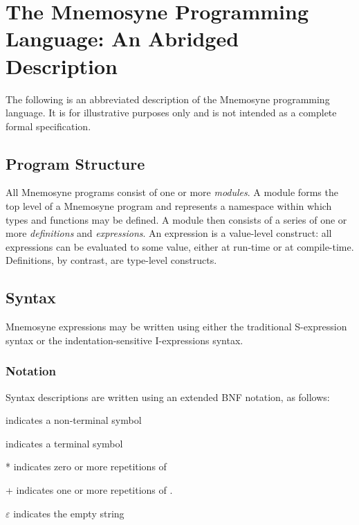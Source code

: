%

\chapter{The Mnemosyne Programming Language: An Abridged Description}\label{app:spec}

The following is an abbreviated description of the Mnemosyne programming language. It is for illustrative purposes only and is not intended as a complete formal specification.

\section{Program Structure}

All Mnemosyne programs consist of one or more \textit{modules}. A module forms the top level of a Mnemosyne program and represents a namespace within which types and functions may be defined. A module then consists of a series of one or more \textit{definitions} and \textit{expressions}. An expression is a value-level construct: all expressions can be evaluated to some value, either at run-time or at compile-time. Definitions, by contrast, are type-level constructs.

\section{Syntax}

Mnemosyne expressions may be written using either the traditional S-expression syntax or the indentation-sensitive I-expressions syntax.


\subsection{Notation}
Syntax descriptions are written using an extended BNF notation, as follows:
\begin{description}
    \item{} indicates a non-terminal symbol
    \item{} indicates a terminal symbol
    \item{* } indicates zero or more repetitions of 
    \item{+} indicates one or more repetitions of .
    \item{$\varepsilon$} indicates the empty string
\end{description}

